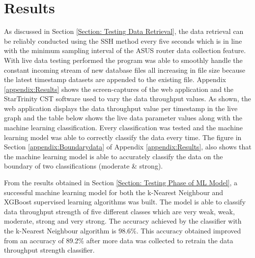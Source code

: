 


\section{Results} 





As discussed in Section \ref{Section: Testing Data Retrieval}, the data retrieval can be reliably conducted using the SSH method every five seconds which is in line with the minimum sampling interval of the ASUS router data collection feature. With live data testing performed the program was able to smoothly handle the constant incoming stream of new database files all increasing in file size because the latest timestamp datasets are appended to the existing file. Appendix \ref{appendix:Results} shows the screen-captures of the web application and the StarTrinity CST software used to vary the data throughput values. As shown, the web application displays the data throughput value per timestamp in the live graph and the table below shows the live data parameter values along with the machine learning classification. Every classification was tested and the machine learning model was able to correctly classify the data every time. The figure in Section \ref{appendix:Boundarydata} of Appendix \ref{appendix:Results}, also shows that the machine learning model is able to accurately classify the data on the boundary of two classifications (moderate \& strong). 

From the results obtained in Section \ref{Section: Testing Phase of ML Model}, a successful machine learning model for both the k-Nearest Neighbour and XGBoost supervised learning algorithms was built. The model is able to classify data throughput strength of five different classes which are very weak, weak, moderate, strong and very strong. The accuracy achieved by the classifier with the k-Nearest Neighbour algorithm is 98.6\%. This accuracy obtained improved from an accuracy of 89.2\% after more data was collected to retrain the data throughput strength classifier. 

